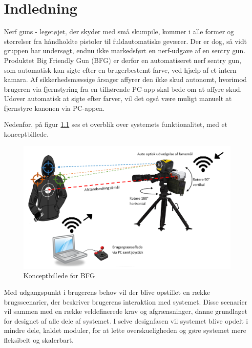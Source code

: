 \graphicspath{{Chapters/Indledning/}}

\chapter{Indledning}

Nerf guns - legetøjet, der skyder med små skumpile, kommer i alle former og størrelser fra håndholdte pistoler til fuldautomatiske geværer. Der er dog, så vidt gruppen har undersøgt, endnu ikke markedsført en nerf-udgave af en sentry gun. Produktet Big Friendly Gun (BFG) er derfor en automatiseret nerf sentry gun, som automatisk kan sigte efter en brugerbestemt farve, ved hjælp af et intern kamara. Af sikkerhedsmæssige årsager affyrer den ikke skud autonomt, hvorimod brugeren via fjernstyring fra en tilhørende PC-app skal bede om at affyre skud. Udover automatisk at sigte efter farver, vil det også være muligt manuelt at fjernstyre kanonen via PC-appen.

Nedenfor, på figur \ref{fig:rigt_billede} ses et overblik over systemets funktionalitet, med et konceptbillede.

\begin{figure}[H]
	\centering
	\includegraphics[width = 400pt]{Img/Konceptbillede}
	\caption{Konceptbillede for BFG}
	\label{fig:rigt_billede}
\end{figure}

Med udgangspunkt i brugerens behov vil der blive opstillet en række brugsscenarier, der beskriver brugerens interaktion med systemet. Disse scenarier vil sammen med en række veldefinerede krav og afgrænsninger, danne grundlaget for designet af alle dele af systemet. I selve designfasen vil systemet blive opdelt i mindre dele, kaldet moduler, for at lette overskueligheden og gøre systemet mere fleksibelt og skalerbart.  \\ 

